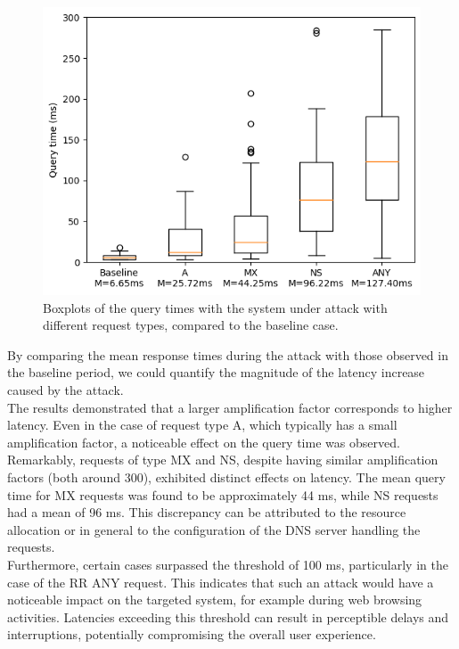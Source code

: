 \begin{figure}[H]
    \centering
    \includegraphics[width=\columnwidth]{Sections/Images/Boxplots_Query.png}
    \caption{Boxplots of the query times with the system under attack with different request types, compared to the baseline case.}
    \label{fig:Boxplots_Query1}
\end{figure}
\noindent By comparing the mean response times during the attack with those observed in the baseline period, we could quantify the magnitude of the latency increase caused by the attack.\\
The results demonstrated that a larger amplification factor corresponds to higher latency. Even in the case of request type A, which typically has a small amplification factor, a noticeable effect on the query time was observed. Remarkably, requests of type MX and NS, despite having similar amplification factors (both around 300), exhibited distinct effects on latency. The mean query time for MX requests was found to be approximately 44 ms, while NS requests had a mean of 96 ms. This discrepancy can be attributed to the resource allocation or in general to the configuration of the DNS server handling the requests.\\
Furthermore, certain cases surpassed the threshold of 100 ms, particularly in the case of the RR ANY request. This indicates that such an attack would have a noticeable impact on the targeted system, for example during web browsing activities. Latencies exceeding this threshold can result in perceptible delays and interruptions, potentially compromising the overall user experience.\\
